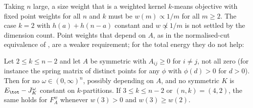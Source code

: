 \noindent Taking $n$ large, a size weight that is a weighted kernel $k$-means objective with fixed point weights for all $n$ and $k$ must be $w(m)\propto1/m$ for all $m\ge2$. The case $k=2$ with $h(a)+h(n-a)$ constant and $w\not\propto1/m$ is not settled by the dimension count. Point weights that depend on $A$, as in the normalised-cut equivalence of \citet{dhillon2004,dhillon2007}, are a weaker requirement; for the total energy they do not help:

\begin{proposition}\label{prop:weightsdd}
Let $2\le k\le n-2$ and let $A$ be symmetric with $A_{ij}\ge0$ for $i\ne j$, not all zero (for instance the spring matrix of distinct points for any $\phi$ with $\phi(d)>0$ for $d>0$). Then for no $\omega\in(0,\infty)^n$, possibly depending on $A$, and no symmetric $K$ is $E_\tot-J^\omega_K$ constant on $k$-partitions. If $3\le k\le n-2$ or $(n,k)=(4,2)$, the same holds for $F^w_A$ whenever $w(3)>0$ and $w(3)\ge w(2)$. 
\end{proposition}
